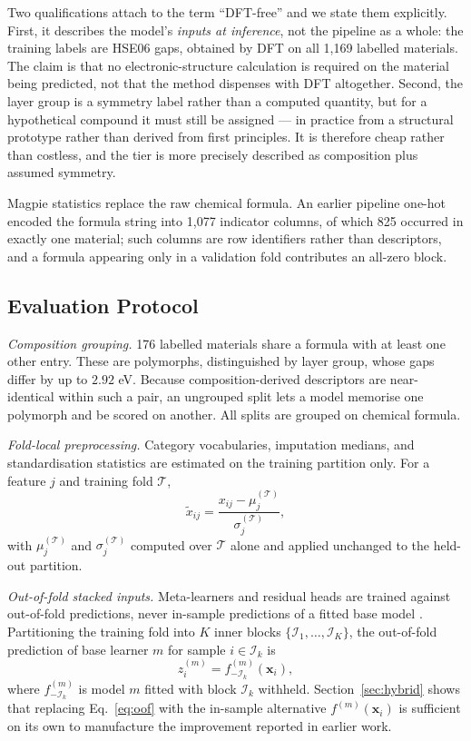 \documentclass{ieeeaccess}
\begin{document}
Two qualifications attach to the term ``DFT-free'' and we state them explicitly. First, it describes the model's \emph{inputs at inference}, not the pipeline as a whole: the training labels are HSE06 gaps, obtained by DFT on all 1{,}169 labelled materials. The claim is that no electronic-structure calculation is required on the material being predicted, not that the method dispenses with DFT altogether. Second, the layer group is a symmetry label rather than a computed quantity, but for a hypothetical compound it must still be assigned --- in practice from a structural prototype rather than derived from first principles. It is therefore cheap rather than costless, and the tier is more precisely described as composition plus assumed symmetry.

Magpie statistics replace the raw chemical formula. An earlier pipeline one-hot encoded the formula string into 1{,}077 indicator columns, of which 825 occurred in exactly one material; such columns are row identifiers rather than descriptors, and a formula appearing only in a validation fold contributes an all-zero block.

\subsection{Evaluation Protocol}
\label{sec:protocol}
\textit{Composition grouping.} 176 labelled materials share a formula with at least one other entry. These are polymorphs, distinguished by layer group, whose gaps differ by up to $2.92$ eV. Because composition-derived descriptors are near-identical within such a pair, an ungrouped split lets a model memorise one polymorph and be scored on another. All splits are grouped on chemical formula.

\textit{Fold-local preprocessing.} Category vocabularies, imputation medians, and standardisation statistics are estimated on the training partition only. For a feature $j$ and training fold $\mathcal{T}$,
\begin{equation}
\tilde{x}_{ij} = \frac{x_{ij} - \mu_j^{(\mathcal{T})}}{\sigma_j^{(\mathcal{T})}},
\label{eq:zscore}
\end{equation}
with $\mu_j^{(\mathcal{T})}$ and $\sigma_j^{(\mathcal{T})}$ computed over $\mathcal{T}$ alone and applied unchanged to the held-out partition.

\textit{Out-of-fold stacked inputs.} Meta-learners and residual heads are trained against out-of-fold predictions, never in-sample predictions of a fitted base model \cite{wolpert1992stacked}. Partitioning the training fold into $K$ inner blocks $\{\mathcal{I}_1,\dots,\mathcal{I}_K\}$, the out-of-fold prediction of base learner $m$ for sample $i \in \mathcal{I}_k$ is
\begin{equation}
z_i^{(m)} = f^{(m)}_{-\mathcal{I}_k}(\mathbf{x}_i),
\label{eq:oof}
\end{equation}
where $f^{(m)}_{-\mathcal{I}_k}$ is model $m$ fitted with block $\mathcal{I}_k$ withheld. Section~\ref{sec:hybrid} shows that replacing Eq.~\eqref{eq:oof} with the in-sample alternative $f^{(m)}(\mathbf{x}_i)$ is sufficient on its own to manufacture the improvement reported in earlier work.
\end{document}
